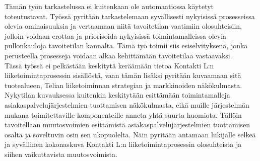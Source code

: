 \documentclass[finnish,12pt,a4paper,pdftex]{article}
\begin{document}
\noindent Tämän työn tarkastelussa ei kuitenkaan ole automaatiossa käytetyt toteutustavat. Työssä pyritään tarkastelemaan syvällisesti nykyisissä prosesseissa olevia ominaisuuksia ja vertaamaan niitä tavoitetilan vaatimiin olosuhteisiin, jolloin voidaan erottaa ja priorisoida nykyisissä toimintamalleissa olevia pullonkauloja tavoitetilan kannalta. Tämä työ toimii siis esiselvityksenä, jonka perusteella prosesseja voidaan alkaa kehittämään tavoitetilaa vastaavaksi.\\

\noindent Tässä työssä ei pelkästään keskitytä keräämään tietoa Kontakti L:n liiketoimintaprosessin sisällöstä, vaan tämän lisäksi pyritään kuvaamaan sitä tuotealueen, Telian liiketoiminnan strategian ja markkinoiden näkökulmasta. Nykytilan kuvauksessa kuitenkin keskitytään esittämään toimintamalleja asiakaspalvelujärjestelmien tuottamisen näkökulmasta, eikä muille järjestelmän mukana toimitettaville komponenteille anneta yhtä suurta huomiota. Tällöin tavoitellaan muutosvoimien esittämistä asiakaspalvelujärjestelmien tuottamisen osalta ja soveltuvin osin sen ukopuolelta.
Näin pyritään antamaan lukijalle selkeä ja syvällinen kokonaskuva Kontakti L:n liiketoimintaprosessin olosuhteista ja siihen vaikuttavista muutosvoimista.\\


\end{document}
